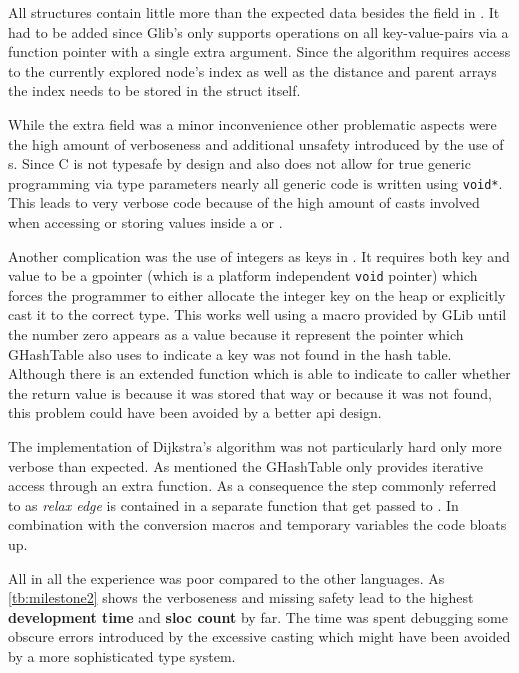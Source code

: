 All structures contain little more than the expected data besides the  field in . It had to be added since Glib's  only supports operations on all key-value-pairs via a function pointer with a single extra argument. Since the algorithm requires access to the currently explored node's index as well as the distance and parent arrays the index needs to be stored in the struct itself.

While the extra field was a minor inconvenience other problematic aspects were the high amount of verboseness and additional unsafety introduced by the use of s. Since C is not typesafe by design and also does not allow for true generic programming via type parameters nearly all generic code is written using \lstinline[style=c]{void*}. This leads to very verbose code because of the high amount of casts involved when accessing or storing values inside a  or .

Another complication was the use of integers as keys in . It requires both key and value to be a gpointer (which is a platform independent \lstinline{void} pointer) which forces the programmer to either allocate the integer key on the heap or explicitly cast it to the correct type. This works well using a macro provided by GLib until the number zero appears as a value because it represent the  pointer which GHashTable also uses to indicate a key was not found in the hash table. Although there is an extended function which is able to indicate to caller whether the return value is  because it was stored that way or because it was not found, this problem could have been avoided by a better \acrshort{api} design.

The implementation of Dijkstra's algorithm was not particularly hard only more verbose than expected. As mentioned the GHashTable only provides iterative access through an extra function. As a consequence the step commonly referred to as \textit{relax edge} is contained in a separate function that get passed to . In combination with the conversion macros and temporary variables the code bloats up.

All in all the experience was poor compared to the other languages. As \autoref{tb:milestone2} shows the verboseness and missing safety lead to the highest \textbf{development time} and \textbf{\gls{sloc} count} by far. The time was spent debugging some obscure errors introduced by the excessive casting which might have been avoided by a more sophisticated type system.

